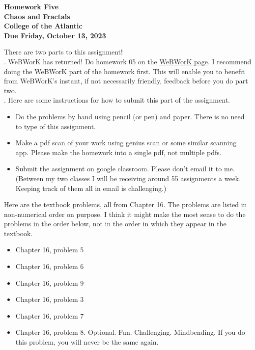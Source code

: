 \documentclass[12pt]{article}
\begin{document}
\pagestyle{empty}
 
\begin{center}
{\LARGE {\bf Homework Five}}\\
\bigskip
{\Large {\bf Chaos and Fractals}}\\
\bigskip
{\Large {\bf College of the Atlantic}}\\
\bigskip
{ {\bf Due Friday, October 13, 2023}}\\  
\end{center}
\medskip

\noindent There are two parts to this assignment!\\

. WeBWorK has returned! Do homework 05
on the 
\href{https://webwork-hosting.runestone.academy/webwork2/coa-feldman-es1026i-fall2023}{WeBWorK page}.  I recommend doing the WeBWorK part of the 
homework first.  This will enable you to benefit from WeBWorK's
instant, if not necessarily friendly, feedback before you do part two.\\

.  Here are some
instructions for how to submit this part of the assignment. \\
\begin{itemize}
\item Do the problems by hand using pencil (or pen) and paper.
  There is no need to type of this assignment.
\item Make a pdf scan of your work using genius scan or some
  similar scanning app.  Please make the homework into a single
  pdf, not multiple pdfs.
\item Submit the assignment on google classroom.  Please don't
  email it to me.  (Between my two classes I will be receiving
  around 55 assignments a week.  Keeping track of them all in email
  is challenging.)
\end{itemize}

\noindent Here are the textbook problems, all from Chapter 16. The problems are
listed in non-numerical order on purpose. I think it might make the
most sense to do the problems in the order below, not in the order in
which they appear in the textbook.
\begin{itemize}
\setlength{\itemsep}{-1mm}
  \item Chapter 16, problem 5
  \item Chapter 16, problem 6
  \item Chapter 16, problem 9
  \item Chapter 16, problem 3
  \item Chapter 16, problem 7
  \item Chapter 16, problem
    8. Optional. Fun. Challenging. Mindbending. If you do this
    problem, you will never be the same again. 
\end{itemize}
\end{document}
